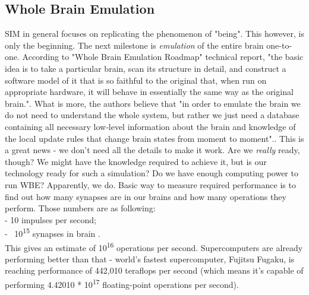\documentclass[12pt]{article}
\begin{document}
\subsection{Whole Brain Emulation}
	SIM in general focuses on replicating the phenomenon of "being". This however, is only the beginning. The next milestone is \emph{emulation} of the entire brain one-to-one. According to "Whole Brain Emulation Roadmap" technical report, "the basic idea is to take a particular brain, scan its structure in detail, and construct a software model of it that is so faithful to the original that, when run on appropriate hardware, it will behave in essentially the same way as the original brain."\cite{wbe:2}. What is more, the authors believe that "in order to emulate the brain we do not need to understand the whole system, but rather we just need a database containing all necessary low‐level information about the brain and knowledge of the local update rules that change brain states from moment to moment".\cite{wbe:2}. This is a great news - we don't need all the details to make it work. Are we \emph{really} ready, though? We might have the knowledge required to achieve it, but is our technology ready for such a simulation? Do we have enough computing power to run WBE? Apparently, we do. Basic way to measure required performance is to find out how many synapses are in our brains and how many operations they perform. Those numbers are as following:
	\\- 10 impulses per second;
	\\- ~10\textsuperscript{15} synapses in brain \cite{uploading:3}.\\This gives an estimate of 10\textsuperscript{16} operations per second. Supercomputers are already performing better than that - world's fastest supercomputer, Fujitsu Fugaku, is reaching performance of 442,010 teraflops per second \cite{wikipediaSupercomputer} (which means it's capable of performing 4.42010 * 10\textsuperscript{17} floating-point operations per second).
\end{document}

